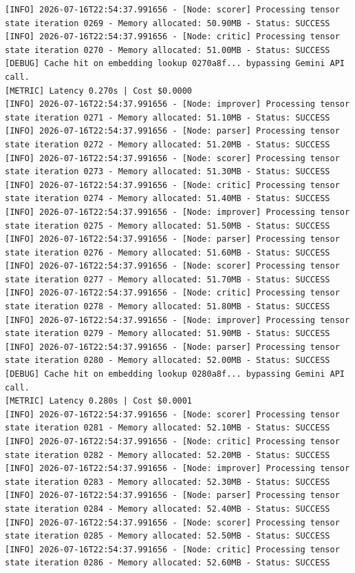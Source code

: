 \documentclass[10pt,journal,compsoc]{IEEEtran}
\begin{document}
\begin{verbatim}
[INFO] 2026-07-16T22:54:37.991656 - [Node: scorer] Processing tensor state iteration 0269 - Memory allocated: 50.90MB - Status: SUCCESS
[INFO] 2026-07-16T22:54:37.991656 - [Node: critic] Processing tensor state iteration 0270 - Memory allocated: 51.00MB - Status: SUCCESS
[DEBUG] Cache hit on embedding lookup 0270a8f... bypassing Gemini API call.
[METRIC] Latency 0.270s | Cost $0.0000
[INFO] 2026-07-16T22:54:37.991656 - [Node: improver] Processing tensor state iteration 0271 - Memory allocated: 51.10MB - Status: SUCCESS
[INFO] 2026-07-16T22:54:37.991656 - [Node: parser] Processing tensor state iteration 0272 - Memory allocated: 51.20MB - Status: SUCCESS
[INFO] 2026-07-16T22:54:37.991656 - [Node: scorer] Processing tensor state iteration 0273 - Memory allocated: 51.30MB - Status: SUCCESS
[INFO] 2026-07-16T22:54:37.991656 - [Node: critic] Processing tensor state iteration 0274 - Memory allocated: 51.40MB - Status: SUCCESS
[INFO] 2026-07-16T22:54:37.991656 - [Node: improver] Processing tensor state iteration 0275 - Memory allocated: 51.50MB - Status: SUCCESS
[INFO] 2026-07-16T22:54:37.991656 - [Node: parser] Processing tensor state iteration 0276 - Memory allocated: 51.60MB - Status: SUCCESS
[INFO] 2026-07-16T22:54:37.991656 - [Node: scorer] Processing tensor state iteration 0277 - Memory allocated: 51.70MB - Status: SUCCESS
[INFO] 2026-07-16T22:54:37.991656 - [Node: critic] Processing tensor state iteration 0278 - Memory allocated: 51.80MB - Status: SUCCESS
[INFO] 2026-07-16T22:54:37.991656 - [Node: improver] Processing tensor state iteration 0279 - Memory allocated: 51.90MB - Status: SUCCESS
[INFO] 2026-07-16T22:54:37.991656 - [Node: parser] Processing tensor state iteration 0280 - Memory allocated: 52.00MB - Status: SUCCESS
[DEBUG] Cache hit on embedding lookup 0280a8f... bypassing Gemini API call.
[METRIC] Latency 0.280s | Cost $0.0001
[INFO] 2026-07-16T22:54:37.991656 - [Node: scorer] Processing tensor state iteration 0281 - Memory allocated: 52.10MB - Status: SUCCESS
[INFO] 2026-07-16T22:54:37.991656 - [Node: critic] Processing tensor state iteration 0282 - Memory allocated: 52.20MB - Status: SUCCESS
[INFO] 2026-07-16T22:54:37.991656 - [Node: improver] Processing tensor state iteration 0283 - Memory allocated: 52.30MB - Status: SUCCESS
[INFO] 2026-07-16T22:54:37.991656 - [Node: parser] Processing tensor state iteration 0284 - Memory allocated: 52.40MB - Status: SUCCESS
[INFO] 2026-07-16T22:54:37.991656 - [Node: scorer] Processing tensor state iteration 0285 - Memory allocated: 52.50MB - Status: SUCCESS
[INFO] 2026-07-16T22:54:37.991656 - [Node: critic] Processing tensor state iteration 0286 - Memory allocated: 52.60MB - Status: SUCCESS

\end{verbatim}
\end{document}
